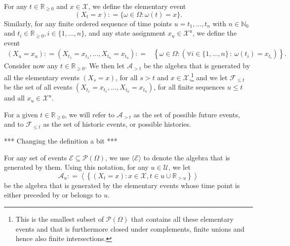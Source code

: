\documentclass[10pt]{paper}
\theoremstyle{definition}
\newcommand{\nats}{\mathbb{N}}
\newcommand{\reals}{\mathbb{R}}
\newcommand{\realsnonneg}{\reals_{\geq 0}}
\newcommand{\states}{\mathcal{X}}
\newcommand{\paths}{\Omega}
\newcommand{\power}{\mathcal{P}(\paths)}
\newcommand{\events}{\mathcal{E}}
\newcommand{\filter}[1][t]{\mathcal{F}_{#1}}
\newcommand{\coloneqq}{:\!=}
\begin{document}
For any $t\in\realsnonneg$ and $x\in\states$, we define the elementary event
\begin{equation*}
(X_t=x)\coloneqq\{\omega\in\paths\colon\omega(t)=x\}.
\end{equation*}
Similarly, for any finite ordered sequence of time points $u=t_1,\ldots,t_n$ with $n\in\nats_0$ and $t_i\in\realsnonneg,i\in\{1,\ldots,n\}$, and any state assignment $x_u\in\states^u$, we define the event
\begin{align*}
(X_u=x_u)\coloneqq\left(X_{t_1}=x_{t_1}, \dots, X_{t_n}=x_{t_n}\right)
\coloneqq&
\left\{\omega\in\paths\colon(\forall i\in\{1,\dots,n\}\,:~\omega(t_i)=x_{t_i})\right\}.%
\end{align*}
Consider now any $t\in\realsnonneg$. We then let $\mathcal{A}_{>t}$ be the algebra that is generated by all the elementary events $(X_s=x)$, for all $s> t$ and $x\in\states$,\footnote{This is the smallest subset of $\power$ that contains all these elementary events and that is furthermore closed under complements, finite unions and hence also finite intersections.} and we let $\mathcal{F}_{\leq t}$ be the set of all events $\left(X_{t_1}=x_{t_1}, \dots, X_{t_n}=x_{t_n}\right)$, for all finite sequences $u\leq t$ and all $x_u\in\states^u$.%

For a given $t\in\realsnonneg$, we will refer to $\mathcal{A}_{> t}$ as the set of possible future events, and to $\mathcal{F}_{\leq t}$ as the set of historic events, or possible histories.

*** Changing the definition a bit ***

For any set of events $\mathcal{E}\subseteq\power$, we use $\langle\mathcal{E}\rangle$ to denote the algebra that is generated by them. Using this notation, for any $u\in\mathcal{U}$, we let
\begin{equation*}
\mathcal{A}_u
\coloneqq
\left\langle
\left\{
(X_t=x)
\colon
x\in\states,t\in u\cup\reals_{>u}
\right\}
\right\rangle
\end{equation*}
be the algebra that is generated by the elementary events whose time point is either preceded by or belongs to $u$.
\end{document}
